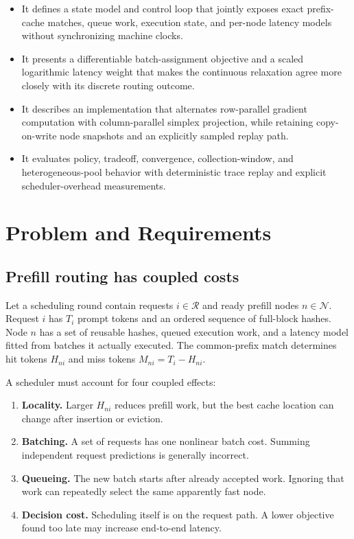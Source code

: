 \documentclass[10pt]{article}
\begin{document}
\begin{itemize}
  \item It defines a state model and control loop that jointly exposes exact
        prefix-cache matches, queue work, execution state, and per-node
        latency models without synchronizing machine clocks.
  \item It presents a differentiable batch-assignment objective and a scaled
        logarithmic latency weight that makes the continuous relaxation agree
        more closely with its discrete routing outcome.
  \item It describes an implementation that alternates row-parallel gradient
        computation with column-parallel simplex projection, while retaining
        copy-on-write node snapshots and an explicitly sampled replay path.
  \item It evaluates policy, tradeoff, convergence, collection-window, and
        heterogeneous-pool behavior with deterministic trace replay and
        explicit scheduler-overhead measurements.
\end{itemize}

\section{Problem and Requirements}
\label{sec:problem}

\subsection{Prefill routing has coupled costs}

Let a scheduling round contain requests $i\in\mathcal{R}$ and ready prefill
nodes $n\in\mathcal{N}$. Request $i$ has $T_i$ prompt tokens and an ordered
sequence of full-block hashes. Node $n$ has a set of reusable hashes, queued
execution work, and a latency model fitted from batches it actually executed.
The common-prefix match determines hit tokens $H_{ni}$ and miss tokens
$M_{ni}=T_i-H_{ni}$.

A scheduler must account for four coupled effects:

\begin{enumerate}
  \item \textbf{Locality.} Larger $H_{ni}$ reduces prefill work, but the best
        cache location can change after insertion or eviction.
  \item \textbf{Batching.} A set of requests has one nonlinear batch cost.
        Summing independent request predictions is generally incorrect.
  \item \textbf{Queueing.} The new batch starts after already accepted work.
        Ignoring that work can repeatedly select the same apparently fast node.
  \item \textbf{Decision cost.} Scheduling itself is on the request path.
        A lower objective found too late may increase end-to-end latency.
\end{enumerate}
\end{document}
